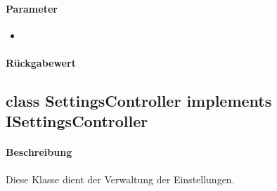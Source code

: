 \paragraph*{Parameter}
\begin{itemize}
    \item 
\end{itemize}
\paragraph*{Rückgabewert}



\subsection{class SettingsController implements ISettingsController}
\paragraph*{Beschreibung}
Diese Klasse dient der Verwaltung der Einstellungen.
